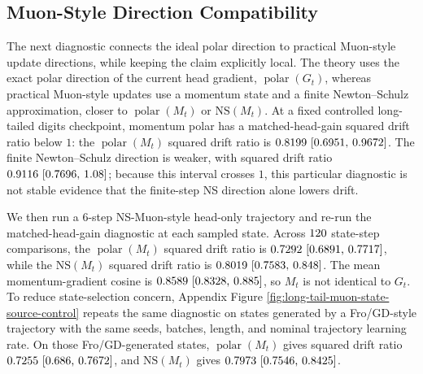 \documentclass{article}
\theoremstyle{definition}
\newcommand{\polar}{\operatorname{polar}}
\begin{document}
\subsection{Muon-Style Direction Compatibility}

The next diagnostic connects the ideal polar direction to practical Muon-style update directions, while keeping the claim explicitly local. The theory uses the exact polar direction of the current head gradient, \(\polar(G_t)\), whereas practical Muon-style updates use a momentum state and a finite Newton--Schulz approximation, closer to \(\polar(M_t)\) or \(\mathrm{NS}(M_t)\). At a fixed controlled long-tailed digits checkpoint, momentum polar has a matched-head-gain squared drift ratio below \(1\): the \(\polar(M_t)\) squared drift ratio is \(0.8199 ~\text{[0.6951,\hspace{0.35em}0.9672]}\). The finite Newton--Schulz direction is weaker, with squared drift ratio \(0.9116 ~\text{[0.7696,\hspace{0.35em}1.08]}\); because this interval crosses \(1\), this particular diagnostic is not stable evidence that the finite-step NS direction alone lowers drift.

We then run a 6-step NS-Muon-style head-only trajectory and re-run the matched-head-gain diagnostic at each sampled state. Across \(120\) state-step comparisons, the \(\polar(M_t)\) squared drift ratio is \(0.7292 ~\text{[0.6891,\hspace{0.35em}0.7717]}\), while the \(\mathrm{NS}(M_t)\) squared drift ratio is \(0.8019 ~\text{[0.7583,\hspace{0.35em}0.848]}\). The mean momentum-gradient cosine is \(0.8589 ~\text{[0.8328,\hspace{0.35em}0.885]}\), so \(M_t\) is not identical to \(G_t\). To reduce state-selection concern, Appendix Figure \ref{fig:long-tail-muon-state-source-control} repeats the same diagnostic on states generated by a Fro/GD-style trajectory with the same seeds, batches, length, and nominal trajectory learning rate. On those Fro/GD-generated states, \(\polar(M_t)\) gives squared drift ratio \(0.7255 ~\text{[0.686,\hspace{0.35em}0.7672]}\), and \(\mathrm{NS}(M_t)\) gives \(0.7973 ~\text{[0.7546,\hspace{0.35em}0.8425]}\).
\end{document}
